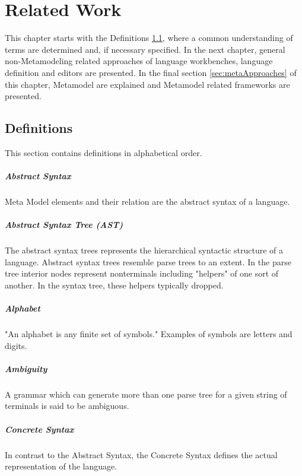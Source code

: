 \chapter{Related Work}
This chapter starts with the Definitions \ref{sec:def}, where a common understanding of terms are determined and, if necessary specified. In the next chapter, general non-Metamodeling related approaches of language workbenches, language definition and editors are presented. In the final section \ref{sec:metaApproaches} of this chapter, Metamodel are explained and Metamodel related frameworks are presented.

\section{Definitions} \label{sec:def}
This section contains definitions in alphabetical order. 
\paragraph{Abstract Syntax} Meta Model elements and their relation are the abstract syntax of a language. \cite{MDSD}

\paragraph{Abstract Syntax Tree (AST)}  
The abstract syntax trees  represents the hierarchical syntactic structure of a language.  Abstract syntax trees resemble parse trees to an extent. In the parse tree interior nodes represent nonterminals including "helpers" of one sort of another. In the syntax tree, these helpers typically dropped. \cite{DragonBook}

\paragraph{Alphabet}
"An alphabet is any finite set of symbols." Examples of symbols are letters and digits. \cite{DragonBook}


\paragraph{Ambiguity} 
A grammar which can generate more than one parse tree for a given string of terminals is said to be ambiguous.\cite{DragonBook}

 
\paragraph{Concrete Syntax} In contrast to the Abstract Syntax, the Concrete Syntax defines the actual representation of the language. \cite{MDSD}

